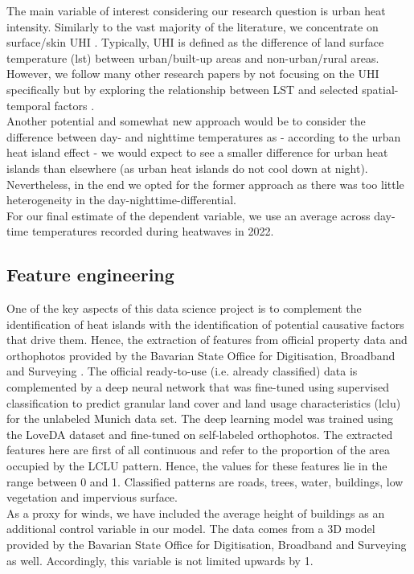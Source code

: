 \documentclass[12pt]{article}
\begin{document}
The main variable of interest considering our research question is urban heat intensity. Similarly to the vast majority of the literature, we concentrate on surface/skin UHI \citep{deilami2018}. Typically, UHI is defined as the difference of land surface temperature (\acrshort{lst}) between urban/built-up areas and non-urban/rural areas. However, we follow many other research papers by not focusing on the UHI specifically but by exploring the relationship between LST and selected spatial-temporal factors \citep{deilami2018}.\\
Another potential and somewhat new approach would be to consider the difference between day- and nighttime temperatures as - according to the urban heat island effect - we would expect to see a smaller difference for urban heat islands than elsewhere (as urban heat islands do not cool down at night). Nevertheless, in the end we opted for the former approach as there was too little heterogeneity in the day-nighttime-differential.\\
For our final estimate of the dependent variable, we use an average across day-time temperatures recorded during heatwaves in 2022.

\subsection{Feature engineering}

One of the key aspects of this data science project is to complement the identification of heat islands with the identification of potential causative factors that drive them. Hence, the extraction of features from official property data and orthophotos provided by the Bavarian State Office for Digitisation, Broadband and Surveying \citep{bayern2018}. The official ready-to-use (i.e. already classified) data is complemented by a deep neural network that was fine-tuned using supervised classification to predict granular land cover and land usage characteristics (\acrshort{lclu}) for the unlabeled Munich data set. The deep learning model was trained using the LoveDA dataset \citep{loveda2021} and fine-tuned on self-labeled orthophotos. The extracted features here are first of all continuous and refer to the proportion of the area occupied by the LCLU pattern. Hence, the values for these features lie in the range between 0 and 1. Classified patterns are roads, trees, water, buildings, low vegetation and impervious surface.\\
As a proxy for winds, we have included the average height of buildings as an additional control variable in our model. The data comes from a 3D model provided by the Bavarian State Office for Digitisation, Broadband and Surveying \citep{bayern2018} as well. Accordingly, this variable is not limited upwards by 1.
\end{document}
